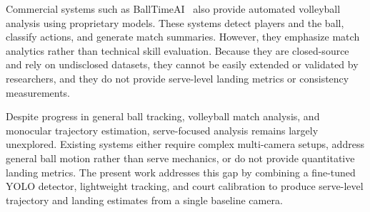 Commercial systems such as BallTimeAI~\cite{balltime} also provide automated volleyball analysis using proprietary models. These systems detect players and the ball, classify actions, and generate match summaries. However, they emphasize match analytics rather than technical skill evaluation. Because they are closed-source and rely on undisclosed datasets, they cannot be easily extended or validated by researchers, and they do not provide serve-level landing metrics or consistency measurements.

Despite progress in general ball tracking, volleyball match analysis, and monocular trajectory estimation, serve-focused analysis remains largely unexplored. Existing systems either require complex multi-camera setups, address general ball motion rather than serve mechanics, or do not provide quantitative landing metrics. The present work addresses this gap by combining a fine-tuned YOLO detector, lightweight tracking, and court calibration to produce serve-level trajectory and landing estimates from a single baseline camera.
